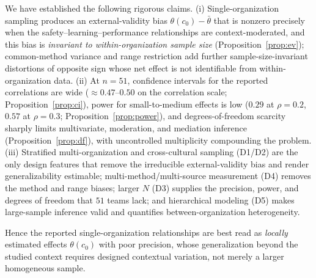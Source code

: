 \documentclass{amsart}
\theoremstyle{definition}
\begin{document}
We have established the following rigorous claims.
(i) Single-organization sampling produces an external-validity bias
$\theta(c_0)-\bar\theta$ that is nonzero precisely when the
safety--learning--performance relationships are context-moderated, and this
bias is \emph{invariant to within-organization sample size}
(Proposition~\ref{prop:ev}); common-method variance and range restriction
add further sample-size-invariant distortions of opposite sign whose net
effect is not identifiable from within-organization data.
(ii) At $n=51$, confidence intervals for the reported correlations are wide
($\approx0.47$--$0.50$ on the correlation scale; Proposition~\ref{prop:ci}),
power for small-to-medium effects is low ($0.29$ at $\rho=0.2$, $0.57$ at
$\rho=0.3$; Proposition~\ref{prop:power}), and degrees-of-freedom scarcity
sharply limits multivariate, moderation, and mediation inference
(Proposition~\ref{prop:df}), with uncontrolled multiplicity compounding the
problem.
(iii) Stratified multi-organization and cross-cultural sampling (D1/D2) are
the only design features that remove the irreducible external-validity bias
and render generalizability estimable; multi-method/multi-source measurement
(D4) removes the method and range biases; larger $N$ (D3) supplies the
precision, power, and degrees of freedom that $51$ teams lack; and
hierarchical modeling (D5) makes large-sample inference valid and quantifies
between-organization heterogeneity.

Hence the reported single-organization relationships are best read as
\emph{locally} estimated effects $\theta(c_0)$ with poor precision, whose
generalization beyond the studied context requires designed contextual
variation, not merely a larger homogeneous sample.
\end{document}
